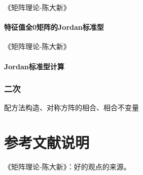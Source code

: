 \documentclass[UTF8]{../../09-Mathematics}
\begin{document}
《矩阵理论-陈大新》

\subsubsection{特征值全0矩阵的Jordan标准型}

《矩阵理论-陈大新》



\subsubsection{Jordan标准型计算}


\subsection{二次}
配方法构造、对称方阵的相合、相合不变量


\chapter{参考文献说明}
《矩阵理论-陈大新》：好的观点的来源。


\end{document}
